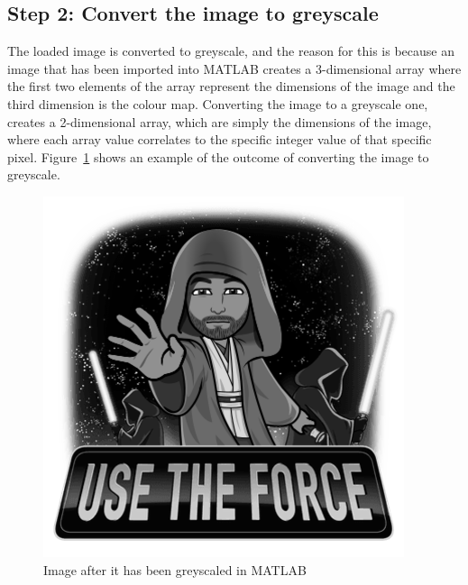 \documentclass[10pt,twocolumn]{witseiepaper}
\begin{document}
\subsection{Step 2: Convert the image to greyscale}
\label{sec: Step 2}
The loaded image is converted to greyscale, and the reason for this is because an image that has been imported into MATLAB creates a 3-dimensional array where the first two elements of the array represent the dimensions of the image and the third dimension is the colour map. Converting the image to a greyscale one, creates a 2-dimensional array, which are simply the dimensions of the image, where each array value correlates to the specific integer value of that specific pixel. Figure~\ref{fig: Step 2} shows an example of the outcome of converting the image to greyscale.
\begin{figure}[h!]
\renewcommand{\thefigure}{\arabic{figure}}
\centering
\includegraphics[scale=0.3, frame]{Step2.png}
\caption{Image after it has been greyscaled in MATLAB}
\label{fig: Step 2}
\end{figure}
\end{document}
